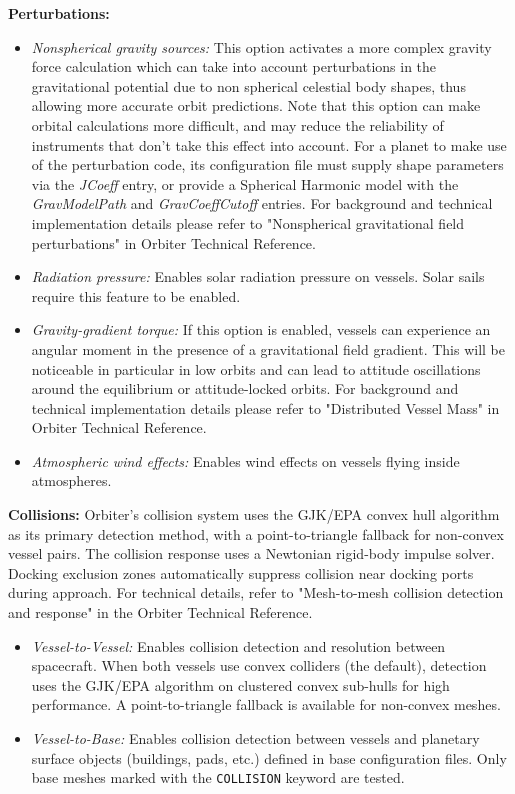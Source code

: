 \documentclass[Orbiter User Manual.tex]{subfiles}
\begin{document}
\textbf{Perturbations:}
\begin{itemize}
	\item \emph{Nonspherical gravity sources:} This option activates a more
		complex gravity force calculation which can take into account
		perturbations in the gravitational potential due to non spherical
		celestial body shapes, thus allowing more accurate orbit predictions.
		Note that this option can make orbital calculations more difficult, and
		may reduce the reliability of instruments that don't take this effect
		into account. For a planet to make use of the perturbation code, its
		configuration file must supply shape parameters via the \emph{JCoeff}
		entry, or provide a Spherical Harmonic model with the
		\emph{GravModelPath} and \emph{GravCoeffCutoff} entries. For background
		and technical implementation details please refer to "Nonspherical
		gravitational field perturbations" in Orbiter Technical Reference.
	\item \emph{Radiation pressure:} Enables solar radiation pressure on
		vessels. Solar sails require this feature to be enabled.
	\item \emph{Gravity-gradient torque:} If this option is enabled, vessels can
		experience an angular moment in the presence of a gravitational field
		gradient. This will be noticeable in particular in low orbits and can
		lead to attitude oscillations around the equilibrium or attitude-locked
		orbits. For background and technical implementation details please refer
		to "Distributed Vessel Mass" in Orbiter Technical Reference.
	\item \emph{Atmospheric wind effects:} Enables wind effects on vessels
		flying inside atmospheres.
\end{itemize}

\textbf{Collisions:}
Orbiter's collision system uses the GJK/EPA convex hull algorithm as its primary
detection method, with a point-to-triangle fallback for non-convex vessel pairs.
The collision response uses a Newtonian rigid-body impulse solver. Docking
exclusion zones automatically suppress collision near docking ports during
approach. For technical details, refer to "Mesh-to-mesh collision detection and
response" in the Orbiter Technical Reference.

\begin{itemize}
	\item \emph{Vessel-to-Vessel:} Enables collision detection and resolution
		between spacecraft. When both vessels use convex colliders (the default),
		detection uses the GJK/EPA algorithm on clustered convex sub-hulls for high
		performance. A point-to-triangle fallback is available for non-convex meshes.
	\item \emph{Vessel-to-Base:} Enables collision detection between vessels and
		planetary surface objects (buildings, pads, etc.) defined in base
		configuration files. Only base meshes marked with the \texttt{COLLISION}
		keyword are tested.
\end{itemize}
\end{document}

